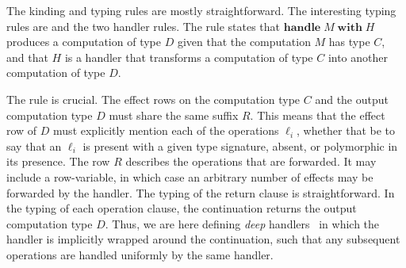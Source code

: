 \documentclass[12pt,mscres,cdtppar,twoside,openright,logo,rightchapter,normalheadings]{infthesis}
\theoremstyle{definition}
\newcommand{\tylab}[1]{\text{\scshape{T-#1}}}
\newcommand{\keyw}[1]{\textbf{#1}}
\newcommand{\Handle}{\keyw{handle}}
\newcommand{\With}{\keyw{with}}
\begin{document}
The kinding and typing rules are mostly straightforward. The
interesting typing rules are \tylab{Handle} and the two handler
rules. The \tylab{Handle} rule states that $\Handle\; M\; \With\; H$
produces a computation of type $D$ given that the computation $M$ has
type $C$, and that $H$ is a handler that transforms a computation of
type $C$ into another computation of type $D$.

The \tylab{Handler} rule is crucial. The effect rows on the
computation type $C$ and the output computation type $D$ must share
the same suffix $R$. This means that the effect row of $D$ must
explicitly mention each of the operations $\ell_i$, whether that be to
say that an $\ell_i$ is present with a given type signature, absent,
or polymorphic in its presence. The row $R$ describes the operations
that are forwarded. It may include a row-variable, in which case an
arbitrary number of effects may be forwarded by the handler.
%
The typing of the return clause is straightforward. In the typing of
each operation clause, the continuation returns the output computation
type $D$. Thus, we are here defining \emph{deep}
handlers~\citep{Kammar2013} in which the handler is implicitly wrapped
around the continuation, such that any subsequent operations are
handled uniformly by the same handler.
%
\end{document}
